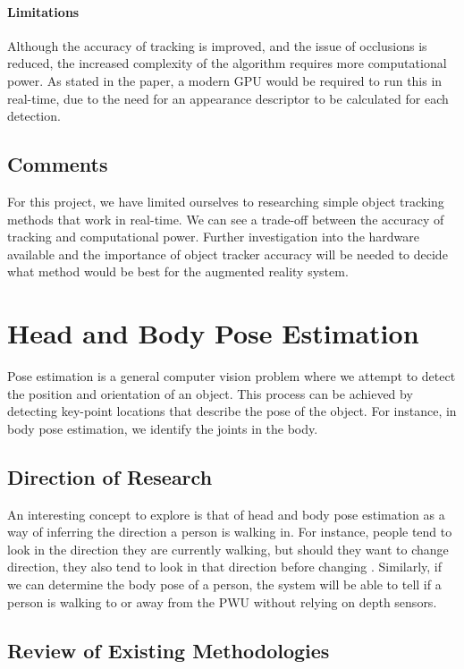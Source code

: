 \paragraph{Limitations}
Although the accuracy of tracking is improved, and the issue of occlusions is reduced, the increased complexity of the algorithm requires more computational power. As stated in the paper, a modern GPU would be required to run this in real-time, due to the need for an appearance descriptor to be calculated for each detection.

\subsection{Comments} \label{sec:objectTrackComments}
For this project, we have limited ourselves to researching simple object tracking methods that work in real-time. We can see a trade-off between the accuracy of tracking and computational power. Further investigation into the hardware available and the importance of object tracker accuracy will be needed to decide what method would be best for the augmented reality system.

\section{Head and Body Pose Estimation}
Pose estimation is a general computer vision problem where we attempt to detect the position and orientation of an object. This process can be achieved by detecting key-point locations that describe the pose of the object. For instance, in body pose estimation, we identify the joints in the body.

\subsection{Direction of Research}
An interesting concept to explore is that of head and body pose estimation as a way of inferring the direction a person is walking in. For instance, people tend to look in the direction they are currently walking, but should they want to change direction, they also tend to look in that direction before changing \cite{Valenti2012}. Similarly, if we can determine the body pose of a person, the system will be able to tell if a person is walking to or away from the PWU without relying on depth sensors.

\subsection{Review of Existing Methodologies}

